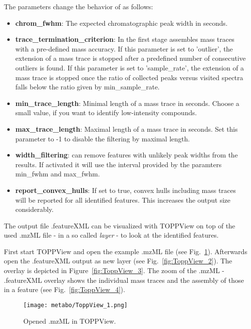 The parameters change the behavior of  as follows:
\begin{itemize}
\item \textbf{chrom\_fwhm}: The expected chromatographic peak width in seconds.
\item \textbf{trace\_termination\_criterion}: In the first stage  assembles mass traces with a pre-defined mass accuracy. If this parameter is set to 'outlier', the extension of a mass trace is stopped after a predefined number of consecutive outliers is found. If this parameter is set to 'sample\_rate', the extension of a mass trace is stopped once the ratio of collected peaks versus visited spectra falls below the ratio given by min\_sample\_rate.
\item \textbf{min\_trace\_length}: Minimal length of a mass trace in seconds. Choose a small value, if you want to identify low-intensity compounds.
\item \textbf{max\_trace\_length}: Maximal length of a mass trace in seconds. Set this parameter to -1 to disable the filtering by maximal length.
\item \textbf{width\_filtering}:  can remove features with unlikely peak widths from the results. If activated it will use the interval provided by the paramters min\_fwhm and max\_fwhm.
\item \textbf{report\_convex\_hulls}: If set to true, convex hulls including mass traces will be reported for all identified features. This increases the output size considerably.
\end{itemize}

\noindent The output file .featureXML can be visualized with TOPPView on top of the used .mzML file - in a so called 	\textit{layer} - to look at the identified features.
\newline
 
\noindent First start TOPPView and open the example .mzML file (see Fig.~\ref{fig:ToppView_1}). Afterwards open the .featureXML output as new layer (see Fig.~\ref{fig:ToppView_2}). The overlay is depicted in Figure~\ref{fig:ToppView_3}. The zoom of the .mzML - .featureXML overlay shows the individual mass traces and the assembly of those in a feature (see Fig.~\ref{fig:ToppView_4}).

\begin{figure}[htbp]
  \centering
  \texttt{[image: metabo/ToppView\_1.png]}
  \caption{Opened .mzML in TOPPView.}
  \label{fig:ToppView_1}
\end{figure}

